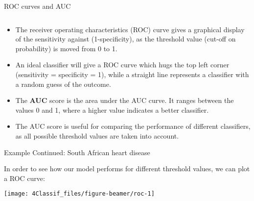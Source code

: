 \documentclass[10pt,ignorenonframetext,]{beamer}
\providecommand{\tightlist}{%
  \setlength{\itemsep}{0pt}\setlength{\parskip}{0pt}}
\begin{document}
\begin{frame}

\begin{block}{ROC curves and AUC}

\(~\)

\begin{itemize}
\tightlist
\item
  The receiver operating characteristics (ROC) curve gives a graphical
  display of the sensitivity against (1-specificity), as the threshold
  value (cut-off on probability) is moved from 0 to 1.
\end{itemize}

\vspace{2mm}

\begin{itemize}
\tightlist
\item
  An ideal classifier will give a ROC curve which hugs the top left
  corner (sensitivity = specificity = 1), while a straight line
  represents a classifier with a random guess of the outcome.
\end{itemize}

\vspace{2mm}

\begin{itemize}
\tightlist
\item
  The \textbf{AUC} score is the area under the AUC curve. It ranges
  between the values 0 and 1, where a higher value indicates a better
  classifier.
\end{itemize}

\vspace{2mm}

\begin{itemize}
\tightlist
\item
  The AUC score is useful for comparing the performance of different
  classifiers, as all possible threshold values are taken into account.
\end{itemize}

\end{block}

\end{frame}

\begin{frame}

\begin{block}{Example Continued: South African heart disease}

In order to see how our model performs for different threshold values,
we can plot a ROC curve:

\vspace{2mm}

\scriptsize

\begin{center}\texttt{[image: 4Classif\_files/figure-beamer/roc-1]} \end{center}

\end{block}

\end{frame}
\end{document}
